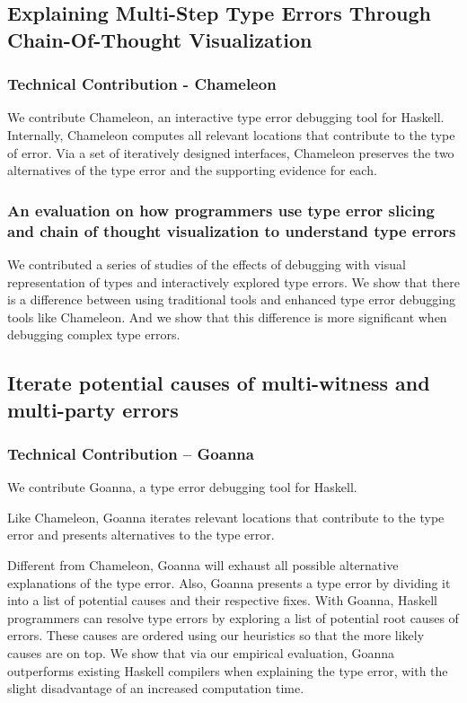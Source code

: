 \subsection{Explaining Multi-Step Type Errors Through Chain-Of-Thought Visualization}

\subsubsection{Technical Contribution - Chameleon}
We contribute Chameleon, an interactive type error debugging tool for Haskell. Internally, Chameleon computes all relevant locations that contribute to the type of error. Via a set of iteratively designed interfaces, Chameleon preserves the two alternatives of the type error and the supporting evidence for each.

\subsubsection{An evaluation on how programmers use type error slicing and chain of thought visualization to understand type errors}
We contributed a series of studies of the effects of debugging with visual representation of types and interactively explored type errors. We show that there is a difference between using traditional tools and enhanced type error debugging tools like Chameleon. And we show that this difference is more significant when debugging complex type errors.

\subsection{Iterate potential causes of multi-witness and multi-party errors}

\subsubsection{Technical Contribution -- Goanna}

We contribute Goanna, a type error debugging tool for Haskell. 

Like Chameleon, Goanna iterates relevant locations that contribute to the type error and presents alternatives to the type error. 

Different from Chameleon, Goanna will exhaust all possible alternative explanations of the type error. Also, Goanna presents a type error by dividing it into a list of potential causes and their respective fixes. With Goanna, Haskell programmers can resolve type errors by exploring a list of potential root causes of errors. These causes are ordered using our heuristics so that the more likely causes are on top. We show that via our empirical evaluation, Goanna outperforms existing Haskell compilers when explaining the type error, with the slight disadvantage of an increased computation time.

